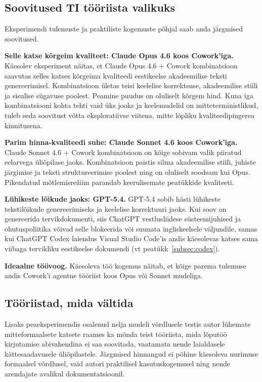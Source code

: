\subsection{Soovitused TI tööriista valikuks} \label{subsec:soovitused}

Eksperimendi tulemuste ja praktiliste kogemuste põhjal saab anda järgmised soovitused.

\textbf{Selle katse kõrgeim kvaliteet: Claude Opus 4.6 koos Cowork'iga.} Käesolev eksperiment näitas, et Claude Opus 4.6 + Cowork kombinatsioon saavutas selles katses kõrgeima kvaliteedi eestikeelse akadeemilise teksti genereerimisel. Kombinatsioon ületas teisi keelelise korrektsuse, akadeemilise stiili ja sisulise sügavuse poolest. Peamine puudus on oluliselt kõrgem hind. Kuna iga kombinatsiooni kohta tehti vaid üks jooks ja keelemudelid on mitteterministlikud, tuleb seda soovitust võtta eksploratiivse viitena, mitte lõpliku kvaliteedipingerea kinnitusena.

\textbf{Parim hinna-kvaliteedi suhe: Claude Sonnet 4.6 koos Cowork'iga.} Claude Sonnet 4.6 + Cowork kombinatsioon on kõige sobivam valik piiratud eelarvega üliõpilase jaoks. Kombinatsioon paistis silma akadeemilise stiili, juhiste järgimise ja teksti struktureerimise poolest ning on oluliselt soodsam kui Opus. Pikendatud mõtlemisrežiim parandab keerulisemate peatükkide kvaliteeti.

\textbf{Lühikeste lõikude jaoks: GPT-5.4.} GPT-5.4 sobib hästi lühikeste tekstilõikude genereerimiseks ja keelelise korrektuuri jaoks. Kui soov on genereerida tervikdokumenti, siis ChatGPT vestlusliidese süsteemijuhised ja ohutuspoliitika võivad selle blokeerida või suunata ingliskeelsele väljundile, samas kui ChatGPT Codex laiendus Visual Studio Code'is andis käesolevas katses sama viibaga tervikliku eestikeelse dokumendi (vt peatükk~\ref{subsec:codex}).

\textbf{Ideaalne töövoog.} Käesoleva töö kogemus näitab, et kõige parema tulemuse andis Cowork'i agentne tööriist koos Opus või Sonnet mudeliga.

\subsection{Tööriistad, mida vältida} \label{subsec:valtida}

Lisaks peaeksperimendis osalenud nelja mudeli võrdlusele testis autor lühemate mitteformaalsete katsete raames ka mõnda teist tööriista, mida lõputöö kirjutamise abivahendina ei saa soovitada, vaatamata nende laialdasele kättesaadavusele üliõpilastele. Järgmised hinnangud ei põhine käesoleva uurimuse formaalsel võrdlusel, vaid autori praktilisel kasutuskogemusel ning nende arendajate avalikul dokumentatsioonil.

